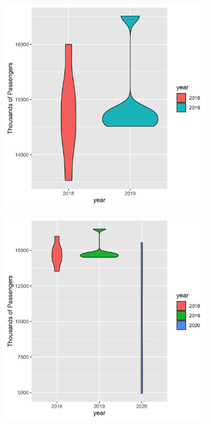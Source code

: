 \documentclass[letterpaper, 10 pt, conference]{article}
\begin{document}
\begin{figure}[h!]
	\centering
	\begin{subfigure}[b]{0.3\linewidth}
		\includegraphics[width=\linewidth]{violin_plot_2018_2019.png}
		\caption{}
	\end{subfigure}
	\begin{subfigure}[b]{0.3\linewidth}
		\includegraphics[width=\linewidth]{violin_plot_2018_to_2020.png}

\end{subfigure}
\end{figure}
\end{document}
